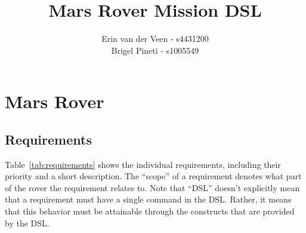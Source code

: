 \documentclass{scrartcl}
\title{Mars Rover Mission DSL}
\author{Erin van der Veen - s4431200\\
	Brigel Pineti - s1005549}
\begin{document}
\maketitle

\section{Mars Rover}
\subsection{Requirements}
Table~\ref{tab:requirements} shows the individual requirements, including their priority and a short description.
The ``scope'' of a requirement denotes what part of the rover the requirement relates to.
Note that ``DSL'' doesn't explicitly mean that a requirement must have a single command in the DSL.
Rather, it means that this behavior must be attainable through the constructs that are provided by the DSL.
\end{document}
